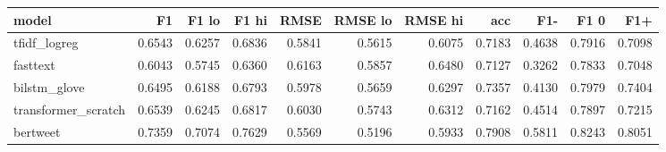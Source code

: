 \begin{tabular}{lrrrrrrrrrr}
\hline
model & F1 & F1 lo & F1 hi & RMSE & RMSE lo & RMSE hi & acc & F1- & F1 0 & F1+ \\
\hline
tfidf_logreg & 0.6543 & 0.6257 & 0.6836 & 0.5841 & 0.5615 & 0.6075 & 0.7183 & 0.4638 & 0.7916 & 0.7098 \\
fasttext & 0.6043 & 0.5745 & 0.6360 & 0.6163 & 0.5857 & 0.6480 & 0.7127 & 0.3262 & 0.7833 & 0.7048 \\
bilstm_glove & 0.6495 & 0.6188 & 0.6793 & 0.5978 & 0.5659 & 0.6297 & 0.7357 & 0.4130 & 0.7979 & 0.7404 \\
transformer_scratch & 0.6539 & 0.6245 & 0.6817 & 0.6030 & 0.5743 & 0.6312 & 0.7162 & 0.4514 & 0.7897 & 0.7215 \\
bertweet & 0.7359 & 0.7074 & 0.7629 & 0.5569 & 0.5196 & 0.5933 & 0.7908 & 0.5811 & 0.8243 & 0.8051 \\
\hline
\end{tabular}
